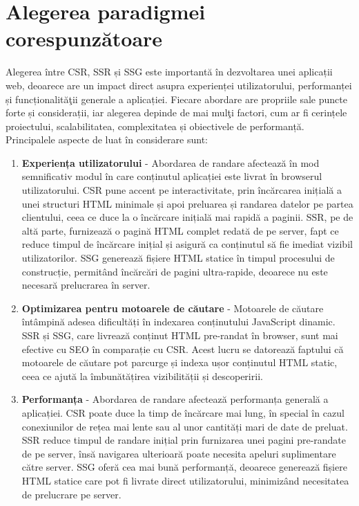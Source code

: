 \documentclass[12pt, a4paper]{report}
\begin{document}
\section{Alegerea paradigmei corespunzătoare}

Alegerea între CSR, SSR și SSG este importantă în dezvoltarea unei aplicații web, deoarece are un impact direct asupra experienței utilizatorului, performanței și funcționalit\u a\c tii generale a aplicației. Fiecare abordare are propriile sale puncte forte și considerații, iar alegerea depinde de mai mul\c ti factori, cum ar fi cerințele proiectului, scalabilitatea, complexitatea și obiectivele de performanță. Principalele aspecte de luat în considerare sunt:

\begin{enumerate}
	\item \textbf{Experiența utilizatorului} - Abordarea de randare afectează în mod semnificativ modul în care conținutul aplicației este livrat în browserul utilizatorului. CSR pune accent pe interactivitate, prin încărcarea inițială a unei structuri HTML minimale și apoi preluarea și randarea datelor pe partea clientului, ceea ce duce la o încărcare inițială mai rapidă a paginii. SSR, pe de altă parte, furnizează o pagină HTML complet redată de pe server, fapt ce reduce timpul de încărcare inițial și asigur\u a ca conținutul să fie imediat vizibil utilizatorilor. SSG generează fișiere HTML statice în timpul procesului de construcție, permitând încărcări de pagini ultra-rapide, deoarece nu este necesară prelucrarea în server.
	\item \textbf{Optimizarea pentru motoarele de căutare} - Motoarele de căutare întâmpină adesea dificultăți în indexarea conținutului JavaScript dinamic. SSR și SSG, care livrează conținut HTML pre-randat în browser, sunt mai efective cu SEO în comparație cu CSR. Acest lucru se datorează faptului că motoarele de căutare pot parcurge și indexa ușor conținutul HTML static, ceea ce ajută la îmbunătățirea vizibilității și descoperirii.
	\item \textbf{Performanța} - Abordarea de randare afectează performanța generală a aplicației. CSR poate duce la timp de încărcare mai lung, în special în cazul conexiunilor de rețea mai lente sau al unor cantități mari de date de preluat. SSR reduce timpul de randare inițial prin furnizarea unei pagini pre-randate de pe server, \^ins\u a navigarea ulterioară poate necesita apeluri suplimentare către server. SSG oferă cea mai bună performanță, deoarece generează fișiere HTML statice care pot fi livrate direct utilizatorului, minimizând necesitatea de prelucrare pe server.

\end{enumerate}
\end{document}
